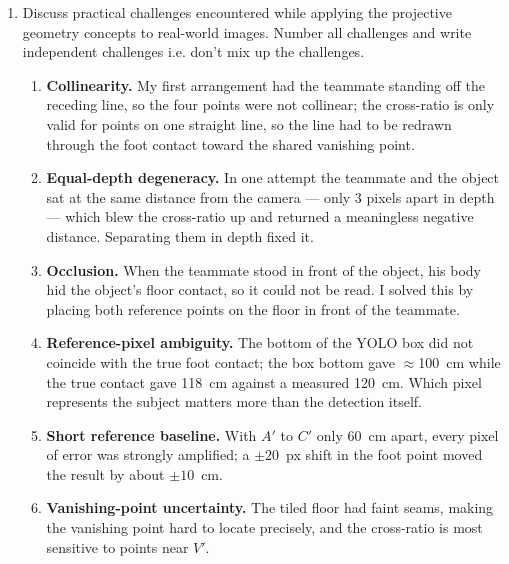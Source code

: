 \begin{enumerate}
\item Discuss practical challenges encountered while applying the projective
geometry concepts to real-world images. Number all challenges and write independent challenges i.e. don't mix up the challenges.
\begin{studentSpace}
\begin{enumerate}
\item \textbf{Collinearity.} My first arrangement had the teammate
  standing off the receding line, so the four points were not collinear;
  the cross-ratio is only valid for points on one straight line, so the
  line had to be redrawn through the foot contact toward the shared
  vanishing point.
\item \textbf{Equal-depth degeneracy.} In one attempt the teammate and
  the object sat at the same distance from the camera --- only 3 pixels
  apart in depth --- which blew the cross-ratio up and returned a
  meaningless negative distance. Separating them in depth fixed it.
\item \textbf{Occlusion.} When the teammate stood in front of the object,
  his body hid the object's floor contact, so it could not be read. I
  solved this by placing both reference points on the floor in front of
  the teammate.
\item \textbf{Reference-pixel ambiguity.} The bottom of the YOLO box did
  not coincide with the true foot contact; the box bottom gave
  $\approx$100~cm while the true contact gave 118~cm against a measured
  120~cm. Which pixel represents the subject matters more than the
  detection itself.
\item \textbf{Short reference baseline.} With $A'$ to $C'$ only 60~cm
  apart, every pixel of error was strongly amplified; a $\pm 20$~px shift
  in the foot point moved the result by about $\pm 10$~cm.
\item \textbf{Vanishing-point uncertainty.} The tiled floor had faint
  seams, making the vanishing point hard to locate precisely, and the
  cross-ratio is most sensitive to points near $V'$.
\end{enumerate}
\end{studentSpace}


\end{enumerate}
